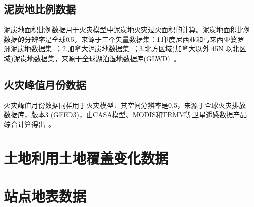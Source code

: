 \subsection{泥炭地比例数据}\label{泥炭地比例数据}
泥炭地面积比例数据用于火灾模型中泥炭地火灾过火面积的计算。泥炭地面积比例数据的分辨率是全球0.5\textdegree，来源于三个矢量数据集：1.印度尼西亚和马来西亚婆罗洲泥炭地数据集~\citep{olson2001terrestrial}；2.加拿大泥炭地数据集~\citep{tarnocai2000peatlands}；3.北方区域(加拿大以外 45\textdegree N 以北区域)泥炭地数据集，来源于全球湖泊湿地数据库(GLWD)~\citep{lehner2004development}。


\subsection{火灾峰值月份数据}\label{火灾峰值月份数据}
火灾峰值月份数据同样用于火灾模型，其空间分辨率是0.5\textdegree，来源于全球火灾排放数据库，版本3 (GFED3)，由CASA模型、MODIS和TRMM等卫星遥感数据产品综合计算得出~\citep{van2010global}。




\section{土地利用土地覆盖变化数据}




\section{站点地表数据}
